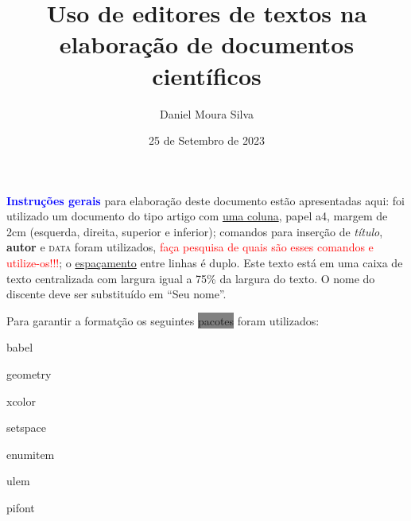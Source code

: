 \documentclass[a4paper]{article}
\title{Uso de editores de textos na elabora\c{c}\~{a}o de documentos cient\'{i}ficos}
\author{Daniel Moura Silva}
\date{25 de Setembro de 2023}
\begin{document}
\maketitle

\begin{center}
    \begin{minipage}{0.75\textwidth}
\textbf{{\textcolor{blue}{Instru\c{c}\~{o}es gerais}}} para elabora\c{c}\~{a}o deste documento est\~{a}o apresentadas aqui: foi utilizado 
um documento do tipo artigo com \underline{uma coluna}, papel a4, margem de 2cm (esquerda, direita, superior e inferior); 
comandos para inser\c{c}\~{a}o de \textit{t\'{i}tulo}, \textbf{autor} e \textsc{data} foram utilizados, {\textcolor{red}{fa\c{c}a pesquisa de quais s\~{a}o 
esses comandos e utilize-os!!!}}; o \underline{espa\c{c}amento} entre linhas \'{e} duplo. Este texto est\'{a} em uma caixa de 
texto centralizada com largura igual a 75\% da largura do texto. O nome do discente deve ser substitu\'{i}do em “Seu nome”. {\color{red}}
    \end{minipage}
\end{center}

\begin{flushleft}
Para garantir a format\c{c}\~{a}o os seguintes \colorbox{gray}{pacotes} foram utilizados: \\
    \begin{enumerate*}[(i),itemjoin=\hfill]
        \item {\color{blue}babel} 
        \item {\color{blue}geometry} 
        \item {\color{blue}xcolor}
        \item {\color{blue}setspace} 
        \item {\color{blue}enumitem} 
        \item {\color{blue}ulem} 
        \item {\color{blue}pifont}
    \end{enumerate*}
\end{flushleft}
\end{document}

